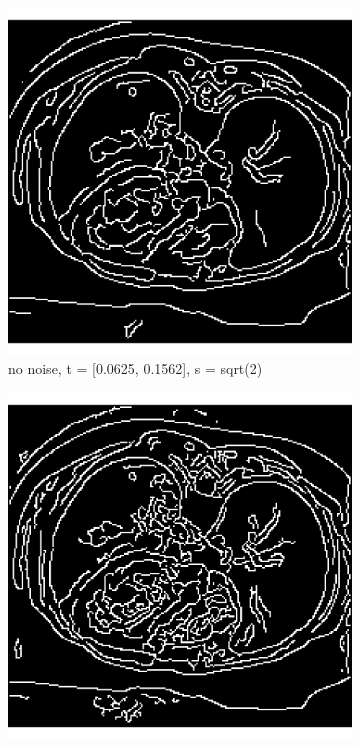 \begin{figure}[H]
  \centering
  
  \begin{subfigure}{.5\textwidth}
    \centering
    \includegraphics[width=.9\textwidth]{./canny1/no_noise_t_00625_01562}
    \caption{no noise, t = [0.0625, 0.1562], s = sqrt(2)}
    \label{fig:cany_no_noise_default}
  \end{subfigure}%
  \begin{subfigure}{.5\textwidth}
    \centering
    \includegraphics[width=.9\textwidth]{./canny1/no_noise_s_srt_1}

\end{subfigure}
\end{figure}
